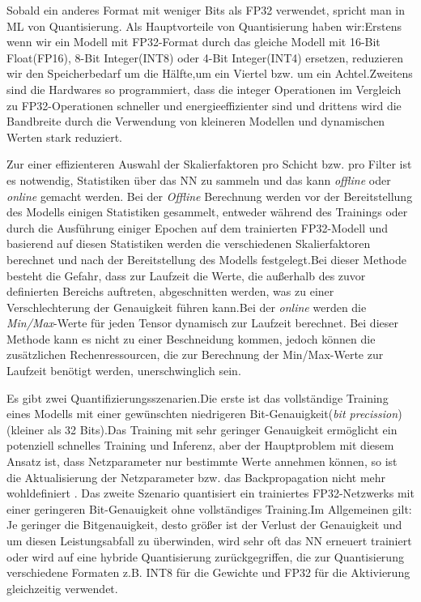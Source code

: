 \documentclass[12pt,a4paper]{scrartcl}
\numberwithin{equation}{section}
\begin{document}
Sobald ein anderes Format mit weniger Bits als FP32 verwendet, spricht man in \ac{ML} von Quantisierung.
Als Hauptvorteile von Quantisierung haben wir:Erstens wenn wir ein Modell mit FP32-Format durch das gleiche Modell mit 16-Bit Float(FP16), 8-Bit Integer(INT8)  oder 4-Bit Integer(INT4)  ersetzen, reduzieren wir den Speicherbedarf um die Hälfte,um ein Viertel bzw. um ein Achtel.Zweitens sind die Hardwares so programmiert, dass die integer Operationen im Vergleich zu FP32-Operationen schneller und energieeffizienter sind und drittens wird die Bandbreite durch die Verwendung von kleineren Modellen und dynamischen Werten stark reduziert.
		
Zur einer effizienteren Auswahl der Skalierfaktoren pro Schicht bzw. pro Filter ist es notwendig, Statistiken  über das \ac{NN} zu sammeln und das kann \textit{offline} oder \textit{online} gemacht werden. Bei der \textit{Offline} Berechnung werden vor der Bereitstellung des Modells einigen Statistiken gesammelt, entweder während des Trainings oder durch die Ausführung einiger Epochen auf dem trainierten FP32-Modell und basierend auf diesen Statistiken werden die verschiedenen Skalierfaktoren berechnet und nach der Bereitstellung des Modells festgelegt.Bei dieser Methode besteht die Gefahr, dass zur Laufzeit die Werte, die außerhalb des zuvor definierten Bereichs auftreten, abgeschnitten werden, was zu einer Verschlechterung der Genauigkeit führen kann.Bei der \textit{online} werden die \textit{Min/Max}-Werte für jeden Tensor dynamisch zur Laufzeit berechnet. Bei dieser Methode kann es nicht zu einer Beschneidung kommen, jedoch können die zusätzlichen Rechenressourcen, die zur Berechnung der Min/Max-Werte zur Laufzeit benötigt werden, unerschwinglich sein.\cite{quantization1}

Es gibt zwei Quantifizierungsszenarien.Die erste ist das vollständige Training eines Modells mit einer gewünschten niedrigeren Bit-Genauigkeit(\textit{bit precission})(kleiner als 32 Bits).Das Training mit sehr geringer Genauigkeit ermöglicht ein potenziell schnelles Training und Inferenz, aber der Hauptproblem mit diesem Ansatz ist, dass Netzparameter nur bestimmte Werte annehmen können, so ist die Aktualisierung der Netzparameter bzw. das Backpropagation nicht mehr wohldefiniert \cite{quantizationYoni}.
Das zweite Szenario  quantisiert ein trainiertes FP32-Netzwerks mit einer geringeren Bit-Genauigkeit ohne vollständiges Training.Im Allgemeinen gilt: Je geringer die Bitgenauigkeit, desto größer ist der Verlust der Genauigkeit und um diesen Leistungsabfall zu überwinden, wird sehr oft das \ac{NN} erneuert trainiert oder wird auf eine hybride Quantisierung zurückgegriffen, die zur Quantisierung verschiedene Formaten z.B. INT8 für die Gewichte und FP32 für die Aktivierung gleichzeitig verwendet.
\end{document}
